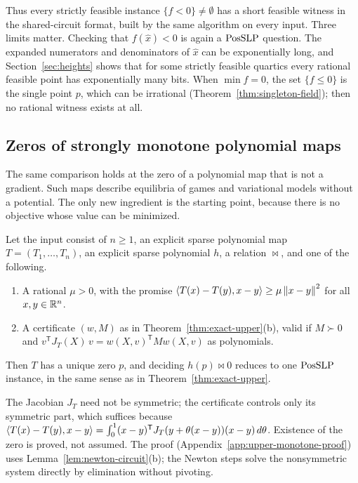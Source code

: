 Thus every strictly feasible instance $\{f<0\}\ne\emptyset$ has a short
feasible witness in the shared-circuit format, built by the same algorithm
on every input. Three limits matter. Checking that $f(\hat x)<0$ is again a
$\mathrm{PosSLP}$ question. The expanded numerators and denominators of $\hat x$ can
be exponentially long, and Section~\ref{sec:heights} shows that for some
strictly feasible quartics every rational feasible point has exponentially
many bits. When $\min f=0$, the set $\{f\le0\}$ is the single point $p$,
which can be irrational (Theorem~\ref{thm:singleton-field}); then no rational
witness exists at all.

\subsection{Zeros of strongly monotone polynomial maps}
\label{sec:upper-monotone}

The same comparison holds at the zero of a polynomial map that is not a
gradient. Such maps describe equilibria of games and variational models
without a potential. The only new ingredient is the starting point, because
there is no objective whose value can be minimized.

\begin{theorem}
\label{thm:upper-monotone}
Let the input consist of $n\ge1$, an explicit sparse polynomial map
$T=(T_1,\ldots,T_n)$, an explicit sparse polynomial $h$, a relation
${\bowtie}$, and one of the following.
\begin{enumerate}[label=(\alph*)]
\item A rational $\mu>0$, with the promise
$\left\langle T(x)-T(y),x-y\right\rangle\ge\mu\left\lVert x-y\right\rVert^2$ for all $x,y\in\mathbb R^n$.
\item A certificate $(w,M)$ as in Theorem~\ref{thm:exact-upper}(b), valid if
$M\succ0$ and $v^{\mathsf T}J_T(X)\,v=w(X,v)^{\mathsf T}Mw(X,v)$ as
polynomials.
\end{enumerate}
Then $T$ has a unique zero $p$, and deciding $h(p)\bowtie0$ reduces to one
$\mathrm{PosSLP}$ instance, in the same sense as in Theorem~\ref{thm:exact-upper}.
\end{theorem}

The Jacobian $J_T$ need not be symmetric; the certificate controls only its
symmetric part, which suffices because
$\left\langle T(x)-T(y),x-y\right\rangle=\int_0^1(x-y)^{\mathsf T}J_T(y+\theta(x-y))(x-y)\,d\theta$.
Existence of the zero is proved, not assumed. The proof
(Appendix~\ref{app:upper-monotone-proof}) uses Lemma~\ref{lem:newton-circuit}(b);
the Newton steps solve the nonsymmetric system directly by elimination
without pivoting.

